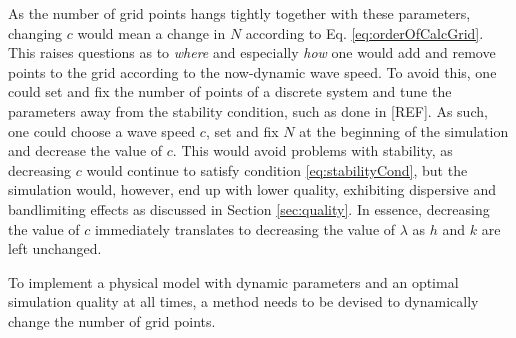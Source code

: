\documentclass[dvipsnames, reprint]{JASA}
\begin{document}
%
%

As the number of grid points hangs tightly together with these parameters, changing $c$ would mean a change in $N$ according to Eq. \eqref{eq:orderOfCalcGrid}. This raises questions as to \textit{where} and especially \textit{how} one would add and remove points to the grid according to the now-dynamic wave speed. To avoid this, one could set and fix the number of points of a discrete system and tune the parameters away from the stability condition, such as done in [REF]. As such, one could choose a wave speed $c$, set and fix $N$ at the beginning of the simulation and decrease the value of $c$. This would avoid problems with stability, as decreasing $c$ would continue to satisfy condition \eqref{eq:stabilityCond}, but the simulation would, however, end up with lower quality, exhibiting dispersive and bandlimiting effects as discussed in Section \ref{sec:quality}. In essence, decreasing the value of $c$ immediately translates to decreasing the value of $\lambda$ as $h$ and $k$ are left unchanged.

To implement a physical model with dynamic parameters and an optimal simulation quality at all times, a method needs to be devised to dynamically change the number of grid points.



\end{document}
